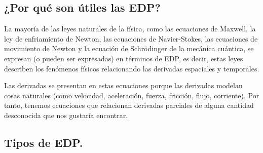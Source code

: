 \subsection*{¿Por qué son útiles las EDP?}

La mayoría de las leyes naturales de la física, como las ecuaciones de Maxwell, la ley de enfriamiento de Newton, las ecuaciones de Navier-Stokes, las ecuaciones de movimiento de Newton y la ecuación de Schrödinger de la mecánica cuántica, se expresan (o pueden ser expresadas) en términos de EDP, es decir, estas leyes describen los fenómenos físicos relacionando las derivadas espaciales y temporales.
\par
Las derivadas se presentan en estas ecuaciones porque las derivadas modelan cosas naturales (como velocidad, aceleración, fuerza, fricción, flujo, corriente). Por tanto, tenemos ecuaciones que relacionan derivadas parciales de alguna cantidad desconocida que nos gustaría encontrar.

\subsection{Tipos de EDP.}

